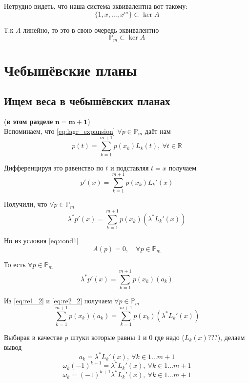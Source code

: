 \documentclass[12pt,a4paper]{article}
\begin{document}
	\noindent Нетрудно видеть, что наша система эквивалентна вот такому:
	\[
	\lbrace 1, x, \ldots, x^m \rbrace \subset \ker A
	\]
	
	\noindent Т.к $A$ линейно, то это в свою очередь эквивалентно
	\begin{equation}
	\mathbb{P}_m \subset \ker A
	\label{eq:cond1}
	\end{equation}
	
	
	\newpage
	\section{Чебышёвские планы}
	\subsection{Ищем веса в чебышёвских планах}
	
	
	\noindent (\textbf{в этом разделе} $\mathbf{n = m+1}$)\\ 
	
	
	\noindent Вспоминаем, что \eqref{eq:lagr_expansion}  $\forall p \in \mathbb{P}_m$ даёт нам
	\[
	p(t) = 
	\sum_{k=1}^{m+1} p(x_k) L_k(t), \  \forall t \in \mathbb{R}
	\]
	
	\noindent Дифференцируя это равенство по $t$ и подставляя $t=x$ получаем 
	\[
	p'(x) = 
	\sum_{k=1}^{m+1} p(x_k) L_k'(x)
	\]
	
	
	\noindent Получили, что $\forall p \in \mathbb{P}_m$
	\begin{equation}
		\lambda^* p'(x) = 
		\sum_{k=1}^{m+1} p(x_k) ( \lambda^* L_k'(x) ) 
		\label{eq:re1_2}
	\end{equation}
	
	\noindent Но из условия \eqref{eq:cond1} 
	\[
	A(p) = 0, \quad \forall p \in \mathbb{P}_m
	\]
	
	\noindent То есть $\forall p \in \mathbb{P}_m$
	\begin{equation}
		\lambda^* p'(x) = 
		\sum_{k=1}^{m+1} p(x_k) ( a_k ) 
		\label{eq:re2_2}
	\end{equation}
	
	\noindent Из \eqref{eq:re1_2} и \eqref{eq:re2_2} получаем $\forall p \in \mathbb{P}_m$
	\[
	\sum_{k=1}^{m+1} p(x_k) ( a_k ) = \sum_{k=1}^{m+1} p(x_k) ( \lambda^* L_k'(x) ) 
	\] 
	
	\noindent Выбирая в качестве $p$ штуки которые равны $1$ и $0$ где надо ($L_k(x) ???$), делаем вывод
	\[
	a_k = \lambda^* L_k'(x), \ \forall k \in 1 \ldots m+1 
	\]
	\[
	\omega_k (-1)^{k+1} = \lambda^* L_k'(x), \ \forall k \in 1 \ldots m+1 
	\]
	\[
	\omega_k  = (-1)^{k+1} \lambda^* L_k'(x), \ \forall k \in 1 \ldots m+1 
	\]
	
\end{document}
